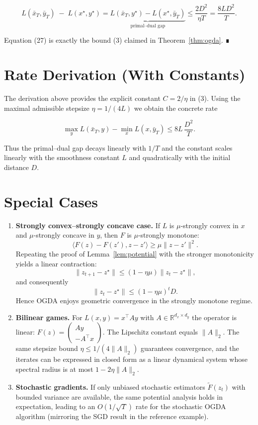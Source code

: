 \documentclass{article}
\begin{document}
\[
L(\bar x_T,\bar y_T)\;-\;L(x^{\star},y^{\star})
=
\underbrace{L(\bar x_T,y^{\star})-L(x^{\star},\bar y_T)}_{\text{primal–dual gap}}
\le
\frac{2D^{2}}{\eta T}
= \frac{8L D^{2}}{T}. \tag{27}
\]

Equation (27) is exactly the bound (3) claimed in Theorem~\ref{thm:ogda}.  ∎

\section{Rate Derivation (With Constants)}
The derivation above provides the explicit constant \(C=2/\eta\) in (3).  Using the maximal admissible stepsize \(\eta=1/(4L)\) we obtain the concrete rate

\[
\boxed{
\max_{y}L(\bar x_T,y)-\min_{x}L(x,\bar y_T)
\le 8L\,\frac{D^{2}}{T}.
}
\]

Thus the primal–dual gap decays linearly with \(1/T\) and the constant scales linearly with the smoothness constant \(L\) and quadratically with the initial distance \(D\).

\section{Special Cases}
\begin{enumerate}[label=(\roman*)]
    \item \textbf{Strongly convex–strongly concave case.}  
    If \(L\) is \(\mu\)-strongly convex in \(x\) and \(\mu\)-strongly concave in \(y\), then \(F\) is \(\mu\)-strongly monotone:
    \[
    \langle F(z)-F(z'),z-z'\rangle\ge \mu\|z-z'\|^{2}.
    \]
    Repeating the proof of Lemma~\ref{lem:potential} with the stronger monotonicity yields a linear contraction:
    \[
    \|z_{t+1}-z^{\star}\|\le (1-\eta\mu)\|z_{t}-z^{\star}\|,
    \]
    and consequently
    \[
    \|z_{t}-z^{\star}\|\le (1-\eta\mu)^{t}D.
    \]
    Hence OGDA enjoys geometric convergence in the strongly monotone regime.

    \item \textbf{Bilinear games.}  
    For \(L(x,y)=x^{\top}Ay\) with \(A\in\mathbb{R}^{d_x\times d_y}\) the operator is linear: \(F(z)=\begin{pmatrix}Ay\\-A^{\top}x\end{pmatrix}\).  
    The Lipschitz constant equals \(\|A\|_{2}\).  The same stepsize bound \(\eta\le 1/(4\|A\|_{2})\) guarantees convergence, and the iterates can be expressed in closed form as a linear dynamical system whose spectral radius is at most \(1-2\eta\|A\|_{2}\).

    \item \textbf{Stochastic gradients.}  
    If only unbiased stochastic estimators \(\tilde F(z_t)\) with bounded variance are available, the same potential analysis holds in expectation, leading to an \(O(1/\sqrt{T})\) rate for the stochastic OGDA algorithm (mirroring the SGD result in the reference example).  
\end{enumerate}
\end{document}
